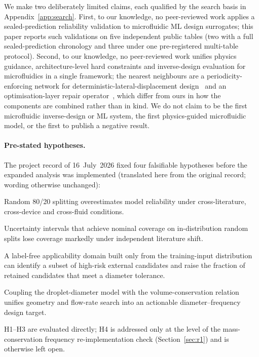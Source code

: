 \documentclass[11pt,a4paper]{article}
\begin{document}
We make two deliberately limited claims, each qualified by the search basis in
Appendix~\ref{app:search}. First, to our knowledge, no peer-reviewed work
applies a sealed-prediction reliability validation to microfluidic ML design
surrogates; this paper reports such validations on five independent public tables
(two with a full sealed-prediction chronology and three under one
pre-registered multi-table protocol). Second, to our knowledge, no peer-reviewed work unifies physics
guidance, architecture-level hard constraints and inverse-design evaluation
for microfluidics in a single framework; the nearest neighbours are a
periodicity-enforcing network for deterministic-lateral-displacement
design~\cite{lee2025} and an optimisation-layer repair
operator~\cite{micromixer2026}, which differ from ours in how the components
are combined rather than in kind. We do not claim to be the first microfluidic
inverse-design or ML system, the first physics-guided microfluidic model, or
the first to publish a negative result.

\paragraph{Pre-stated hypotheses.} The project record of 16~July~2026 fixed
four falsifiable hypotheses before the expanded analysis was implemented
(translated here from the original record; wording otherwise unchanged):
\begin{description}[leftmargin=*,itemsep=1pt]
\item[H1] Random 80/20 splitting overestimates model reliability under
  cross-literature, cross-device and cross-fluid conditions.
\item[H2] Uncertainty intervals that achieve nominal coverage on
  in-distribution random splits lose coverage markedly under independent
  literature shift.
\item[H3] A label-free applicability domain built only from the training-input
  distribution can identify a subset of high-risk external candidates and
  raise the fraction of retained candidates that meet a diameter tolerance.
\item[H4] Coupling the droplet-diameter model with the volume-conservation
  relation unifies geometry and flow-rate search into an actionable
  diameter--frequency design target.
\end{description}
H1--H3 are evaluated directly; H4 is addressed only at the level of the
mass-conservation frequency re-implementation check (Section~\ref{sec:r1}) and is
otherwise left open.
\end{document}
